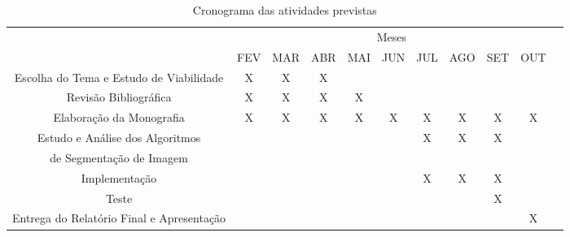 \begin{table}[!htpb]
\centering

\begin{small} 
  
\setlength{\tabcolsep}{3pt} 


\begin{tabular}{|c|c|c|c|c|c|c|c|c|c|c|}\hline
 & \multicolumn{9}{c|}{Meses}\\ \cline{2-10}
\raisebox{1.5ex}{Etapa} & FEV & MAR & ABR & MAI & JUN & JUL & AGO & SET & OUT \\ \hline

Escolha do Tema e Estudo de Viabilidade & X & X & X & & & & & &   \\ \hline
Revisão Bibliográfica & X & X & X & X & & & & &   \\ \hline
Elaboração da Monografia & X & X & X & X & X & X & X & X & X    \\ \hline
Estudo e Análise dos Algoritmos  & &  &  & &  & X & X & X &  \\ 
de Segmentação de Imagem & &  &  & &  &  &  &  &  \\ \hline
Implementação & &  &  & &  & X & X & X &    \\ \hline
Teste & & & & & & & & X &   \\ \hline
Entrega do Relatório Final e Apresentação & & & & & & & & & X  \\ \hline

\end{tabular} 
\end{small}
\caption{Cronograma das atividades previstas}
\label{t_cronograma}
\end{table} 






